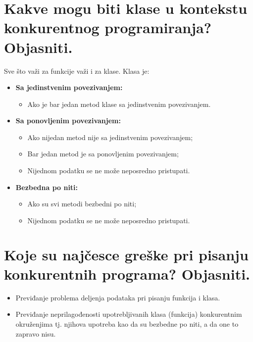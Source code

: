 \documentclass[a4paper]{article}
\begin{document}
\section{Kakve mogu biti klase u kontekstu konkurentnog programiranja? Objasniti.}
  Sve što važi za funkcije važi i za klase. Klasa je:
  \begin{itemize}
    \item \textbf{Sa jedinstvenim povezivanjem:}
          \begin{itemize}
            \item Ako je bar jedan metod klase sa jedinstvenim povezivanjem.
          \end{itemize}
    \item \textbf{Sa ponovljenim povezivanjem:}
          \begin{itemize}  
            \item Ako nijedan metod nije sa jedinstvenim povezivanjem;
            \item Bar jedan metod je sa ponovljenim povezivanjem;
            \item Nijednom podatku se ne može neposredno pristupati.
          \end{itemize}
    \item \textbf{Bezbedna po niti:}
          \begin{itemize}
            \item Ako su svi metodi bezbedni po niti;
            \item Nijednom podatku se ne može neposredno pristupati.
          \end{itemize}
  \end{itemize}
  
\section{Koje su najčesce greške pri pisanju konkurentnih programa? Objasniti.}
  \begin{itemize}
    \item Previđanje problema deljenja podataka pri pisanju funkcija i klasa.
    \item Previđanje neprilagođenosti upotrebljivanih klasa (funkcija) konkurentnim okruženjima tj. 
          njihova upotreba kao da su bezbedne po niti, a da one to zapravo nisu.
  \end{itemize}
  
\end{document}
